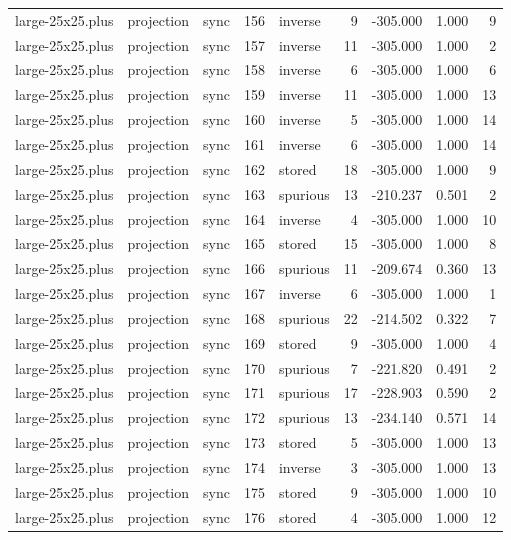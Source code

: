 \begin{tabular}{lllrlrrrr}
large-25x25.plus & projection & sync & 156 & inverse & 9 & -305.000 & 1.000 & 9 \\
large-25x25.plus & projection & sync & 157 & inverse & 11 & -305.000 & 1.000 & 2 \\
large-25x25.plus & projection & sync & 158 & inverse & 6 & -305.000 & 1.000 & 6 \\
large-25x25.plus & projection & sync & 159 & inverse & 11 & -305.000 & 1.000 & 13 \\
large-25x25.plus & projection & sync & 160 & inverse & 5 & -305.000 & 1.000 & 14 \\
large-25x25.plus & projection & sync & 161 & inverse & 6 & -305.000 & 1.000 & 14 \\
large-25x25.plus & projection & sync & 162 & stored & 18 & -305.000 & 1.000 & 9 \\
large-25x25.plus & projection & sync & 163 & spurious & 13 & -210.237 & 0.501 & 2 \\
large-25x25.plus & projection & sync & 164 & inverse & 4 & -305.000 & 1.000 & 10 \\
large-25x25.plus & projection & sync & 165 & stored & 15 & -305.000 & 1.000 & 8 \\
large-25x25.plus & projection & sync & 166 & spurious & 11 & -209.674 & 0.360 & 13 \\
large-25x25.plus & projection & sync & 167 & inverse & 6 & -305.000 & 1.000 & 1 \\
large-25x25.plus & projection & sync & 168 & spurious & 22 & -214.502 & 0.322 & 7 \\
large-25x25.plus & projection & sync & 169 & stored & 9 & -305.000 & 1.000 & 4 \\
large-25x25.plus & projection & sync & 170 & spurious & 7 & -221.820 & 0.491 & 2 \\
large-25x25.plus & projection & sync & 171 & spurious & 17 & -228.903 & 0.590 & 2 \\
large-25x25.plus & projection & sync & 172 & spurious & 13 & -234.140 & 0.571 & 14 \\
large-25x25.plus & projection & sync & 173 & stored & 5 & -305.000 & 1.000 & 13 \\
large-25x25.plus & projection & sync & 174 & inverse & 3 & -305.000 & 1.000 & 13 \\
large-25x25.plus & projection & sync & 175 & stored & 9 & -305.000 & 1.000 & 10 \\
large-25x25.plus & projection & sync & 176 & stored & 4 & -305.000 & 1.000 & 12 \\

\end{tabular}
